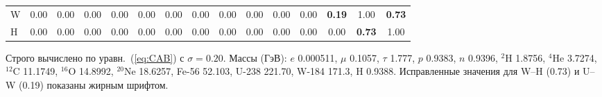 \documentclass[11pt,a4paper]{article}
\begin{document}
\begin{table}[H]
\begin{tabular}{l c c c c c c c c c c c c c c}
			W & 0.00 & 0.00 & 0.00 & 0.00 & 0.00 & 0.00 & 0.00 & 0.00 & 0.00 & 0.00 & 0.00 & \textbf{0.19} & 1.00 & \textbf{0.73} \\
			H & 0.00 & 0.00 & 0.00 & 0.00 & 0.00 & 0.00 & 0.00 & 0.00 & 0.00 & 0.00 & 0.00 & 0.00 & \textbf{0.73} & 1.00 \\
			\bottomrule
		\end{tabular}
		\par\smallskip
		\footnotesize Строго вычислено по уравн.~(\ref{eq:CAB}) с \(\sigma=0.20\). Массы (ГэВ): \(e\) 0.000511, \(\mu\) 0.1057, \(\tau\) 1.777, \(p\) 0.9383, \(n\) 0.9396, \(^2\)H 1.8756, \(^4\)He 3.7274, \(^{12}\)C 11.1749, \(^{16}\)O 14.8992, \(^{20}\)Ne 18.6257, Fe-56 52.103, U-238 221.70, W-184 171.3, H 0.9388. Исправленные значения для W--H (0.73) и U--W (0.19) показаны жирным шрифтом.
	\end{table}
	
\end{document}
